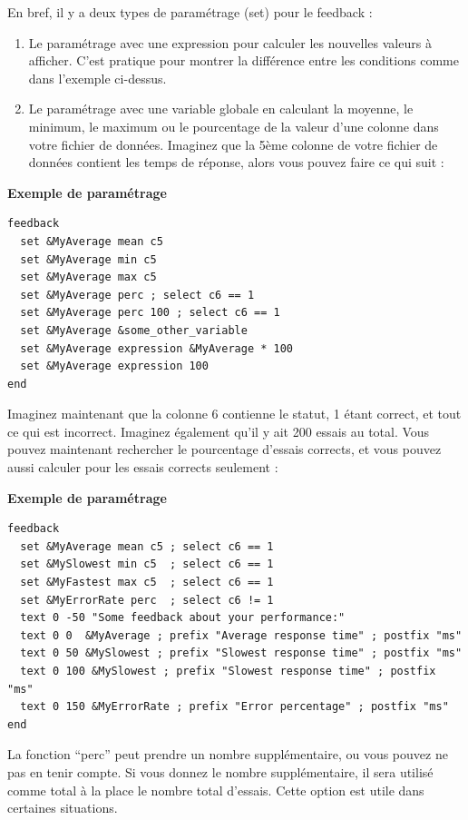 \documentclass[
]{book}
\begin{document}
En bref, il y a deux types de paramétrage (set) pour le feedback :

\begin{enumerate}
\def\labelenumi{\arabic{enumi})}
\item
  Le paramétrage avec une expression pour calculer les nouvelles valeurs à afficher. C'est pratique pour montrer la différence entre les conditions comme dans l'exemple ci-dessus.
\item
  Le paramétrage avec une variable globale en calculant la moyenne, le minimum, le maximum ou le pourcentage de la valeur d'une colonne dans votre fichier de données. Imaginez que la 5ème colonne de votre fichier de données contient les temps de réponse, alors vous pouvez faire ce qui suit :
\end{enumerate}

\textbf{Exemple de paramétrage}

\begin{verbatim}
feedback
  set &MyAverage mean c5
  set &MyAverage min c5
  set &MyAverage max c5
  set &MyAverage perc ; select c6 == 1
  set &MyAverage perc 100 ; select c6 == 1
  set &MyAverage &some_other_variable
  set &MyAverage expression &MyAverage * 100
  set &MyAverage expression 100
end
\end{verbatim}

Imaginez maintenant que la colonne 6 contienne le statut, 1 étant correct, et tout ce qui est incorrect. Imaginez également qu'il y ait 200 essais au total. Vous pouvez maintenant rechercher le pourcentage d'essais corrects, et vous pouvez aussi calculer pour les essais corrects seulement :

\textbf{Exemple de paramétrage}

\begin{verbatim}
feedback
  set &MyAverage mean c5 ; select c6 == 1
  set &MySlowest min c5  ; select c6 == 1
  set &MyFastest max c5  ; select c6 == 1
  set &MyErrorRate perc  ; select c6 != 1
  text 0 -50 "Some feedback about your performance:"
  text 0 0  &MyAverage ; prefix "Average response time" ; postfix "ms"
  text 0 50 &MySlowest ; prefix "Slowest response time" ; postfix "ms"
  text 0 100 &MySlowest ; prefix "Slowest response time" ; postfix "ms"
  text 0 150 &MyErrorRate ; prefix "Error percentage" ; postfix "ms"
end
\end{verbatim}

La fonction ``perc'' peut prendre un nombre supplémentaire, ou vous pouvez ne pas en tenir compte. Si vous donnez le nombre supplémentaire, il sera utilisé comme total à la place le nombre total d'essais. Cette option est utile dans certaines situations.
\end{document}
